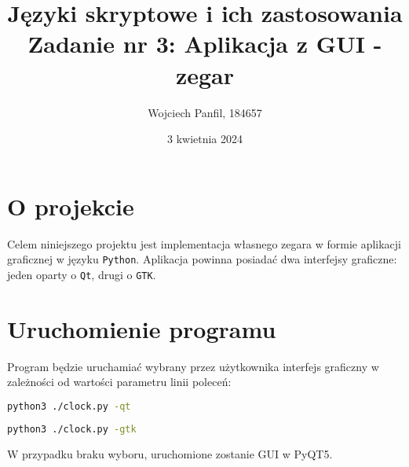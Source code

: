 \documentclass[11pt]{article}
\title{
	\textbf{Języki skryptowe i ich zastosowania}\\
	Zadanie nr 3: Aplikacja z GUI - zegar}
\author{Wojciech Panfil, 184657}
\date{3 kwietnia 2024}
\begin{document}
	\maketitle
	
    \section{O projekcie}
	\justify
	Celem niniejszego projektu jest implementacja własnego zegara w formie
    aplikacji graficznej w języku \texttt{Python}. Aplikacja powinna posiadać
    dwa interfejsy graficzne: jeden oparty o \texttt{Qt}, drugi o \texttt{GTK}.

    \section{Uruchomienie programu}
    Program będzie uruchamiać wybrany przez użytkownika interfejs graficzny w zależności
    od wartości parametru linii poleceń:
    \begin{lstlisting}[language=bash, caption={uruchomienie GUI w PyQT5},captionpos=b]
    python3 ./clock.py -qt
    \end{lstlisting}
    \begin{lstlisting}[language=bash, caption={uruchomienie GUI w PyGTK3},captionpos=b]
    python3 ./clock.py -gtk
    \end{lstlisting}
    W przypadku braku wyboru, uruchomione zostanie GUI w PyQT5.
\end{document}

